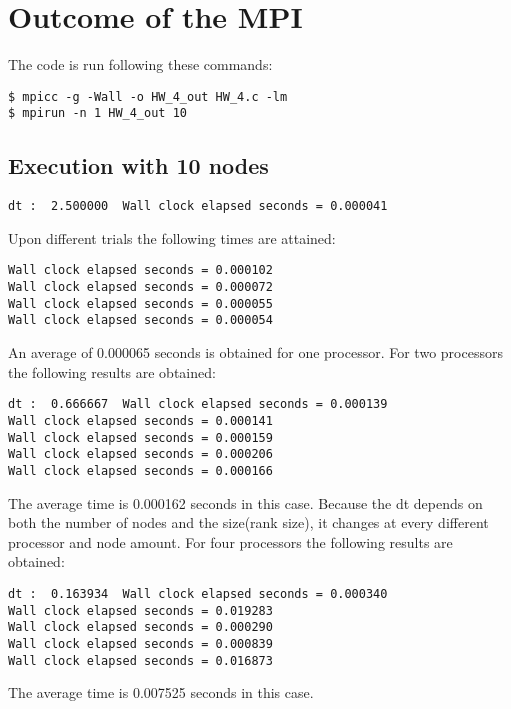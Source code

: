 \documentclass{article}
\begin{document}
\section{Outcome of the MPI}
The code is run following these commands:
\begin{verbatim}
$ mpicc -g -Wall -o HW_4_out HW_4.c -lm
$ mpirun -n 1 HW_4_out 10
\end{verbatim}
\subsection{Execution with 10 nodes}
\begin{verbatim}
dt :  2.500000  Wall clock elapsed seconds = 0.000041
\end{verbatim}
Upon different trials the following times are attained:
\begin{verbatim}
Wall clock elapsed seconds = 0.000102
Wall clock elapsed seconds = 0.000072
Wall clock elapsed seconds = 0.000055
Wall clock elapsed seconds = 0.000054
\end{verbatim}
An average of 0.000065 seconds is obtained for one processor.
For two processors the following results are obtained:
\begin{verbatim}
dt :  0.666667  Wall clock elapsed seconds = 0.000139
Wall clock elapsed seconds = 0.000141
Wall clock elapsed seconds = 0.000159
Wall clock elapsed seconds = 0.000206
Wall clock elapsed seconds = 0.000166
\end{verbatim}
The average time is 0.000162 seconds in this case. Because the dt depends on both the number of nodes and the size(rank size), it changes at every different processor and node amount. 
For four processors the following results are obtained:
\begin{verbatim}
dt :  0.163934  Wall clock elapsed seconds = 0.000340
Wall clock elapsed seconds = 0.019283
Wall clock elapsed seconds = 0.000290
Wall clock elapsed seconds = 0.000839
Wall clock elapsed seconds = 0.016873
\end{verbatim}
The average time is 0.007525 seconds in this case.
\end{document}
